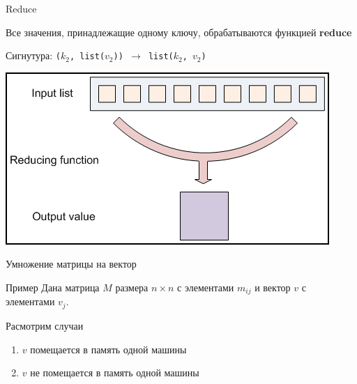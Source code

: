 \documentclass[10pt,a4paper]{beamer}
\begin{document}

\begin{frame}{Reduce}

Все значения, принадлежащие одному ключу, обрабатываются функцией {\bf reduce}

\begin{center}
Сигнутура: \texttt{($k_2$, list($v_2$)) $\rightarrow$ list($k_2$, $v_2$) }

\vspace{2em}

\includegraphics[scale=0.33]{images/reduce.png}
\end{center}

\end{frame}


\begin{frame}{Умножение матрицы на вектор}

\begin{block}{Пример}
Дана матрица  $M$ размера $n \times n$ с элементами $m_{ij}$ и вектор $v$ с элементами $v_j$.  
\end{block}

Расмотрим случаи
\begin{enumerate}
\item $v$ помещается в память одной машины
\item $v$ не помещается в память одной машины
\end{enumerate}

\end{frame}

\end{document}
